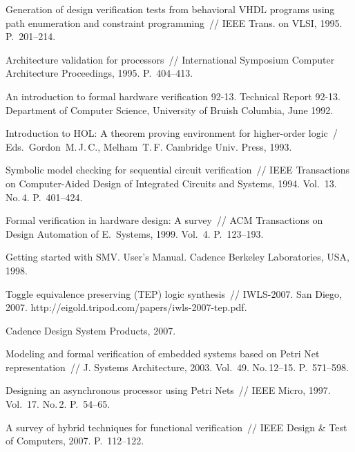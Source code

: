 \begin{multicols}{2}
{{\begin{thebibliography}{99}
Generation of design verification tests from behavioral VHDL programs
using path enumeration and constraint programming~// IEEE Trans. on VLSI, 1995.
 P.~201--214.

Architecture validation for processors~// International
Symposium Computer Architecture Proceedings, 1995. P.~404--413.

An introduction to formal hardware verification 92-13.
Technical Report 92-13.  Department
of Computer Science, University of Bruish Columbia, June 1992.

Introduction to HOL: A theorem proving environment for higher-order logic~/
Eds.\ Gordon~M.\,J.\,C., Melham~T.\,F.
Cambridge Univ. Press, 1993.

Symbolic model checking for
sequential circuit verification~//
IEEE Transactions on Computer-Aided Design of Integrated Circuits and
Systems, 1994. Vol.~13. No.\,4. P.~401--424.

Formal verification in hardware design: A survey~// ACM Transactions on
Design Auto\-mation of E.~Systems, 1999. Vol.~4. P.~123--193.

Getting started with SMV. User's Manual.
Cadence Berkeley Laboratories, USA, 1998.

Toggle equivalence preserving (TEP) logic synthesis~//
IWLS-2007. San Diego, 2007. {\sf
http://eigold.tripod.com/papers/iwls-2007-tep.pdf}.

Cadence Design System Products, 2007.

Modeling and formal veri\-fi\-cation of embedded systems based on Petri Net
repre\-sen\-tation~// J. Systems Architecture, 2003. Vol.~49. No.\,12--15.
P.~571--598.

Designing an asynchronous processor using Petri Nets~//
IEEE Micro, 1997. Vol.~17. No.\,2. P.~54--65.

A survey of hybrid techniques for functional verification~//
IEEE Design \& Test of Computers, 2007. P.~112--122.


\end{thebibliography}}}
\end{multicols}
